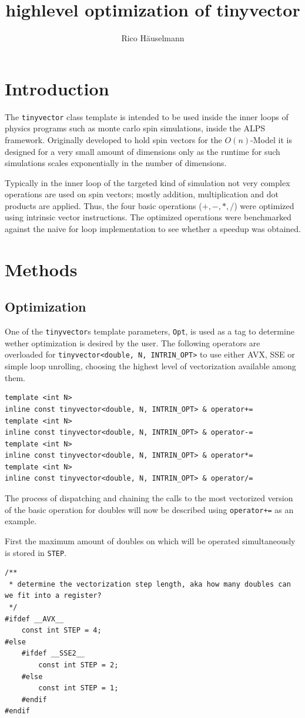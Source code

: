 \documentclass[a4paper]{scrartcl}
\author{Rico Häuselmann}
\title{highlevel optimization of tinyvector}
\begin{document}
\section*{Introduction}
The \texttt{tinyvector} class template is intended to be used inside the inner loops of physics programs such as monte carlo spin simulations,
inside the ALPS framework. Originally developed to hold spin vectors for the $O(n)$-Model it is designed for a very small amount of dimensions only
as the runtime for such simulations scales exponentially in the number of dimensions.

Typically in the inner loop of the targeted kind of simulation not very complex operations are used on spin vectors; mostly addition, multiplication
and dot products are applied. Thus, the four basic operations ($+, -, *, /$) were optimized using intrinsic vector instructions. 
The optimized operations were benchmarked against the naive for loop implementation to see whether a speedup was obtained.

\section*{Methods}
\subsection*{Optimization}
One of the \texttt{tinyvector}s template parameters, \texttt{Opt}, is used as a tag to determine wether optimization is desired by the user.
The following operators are overloaded for \texttt{tinyvector<double, N, INTRIN\_OPT>} to use either AVX, SSE or simple loop unrolling, choosing the highest 
level of vectorization available among them.

\begin{lstlisting}
template <int N>
inline const tinyvector<double, N, INTRIN_OPT> & operator+=
template <int N> 
inline const tinyvector<double, N, INTRIN_OPT> & operator-=
template <int N> 
inline const tinyvector<double, N, INTRIN_OPT> & operator*=
template <int N> 
inline const tinyvector<double, N, INTRIN_OPT> & operator/=
\end{lstlisting}

The process of dispatching and chaining the calls to the most vectorized version of the basic operation for doubles will now be described using
\texttt{operator+=} as an example.

First the maximum amount of doubles on which will be operated simultaneously is stored in \texttt{STEP}.
\begin{lstlisting}                                                                                                    
/** 
 * determine the vectorization step length, aka how many doubles can we fit into a register? 
 */
#ifdef __AVX__
    const int STEP = 4;
#else
    #ifdef __SSE2__
        const int STEP = 2;
    #else
        const int STEP = 1;
    #endif
#endif                                                                                                                  
\end{lstlisting}
\end{document}
